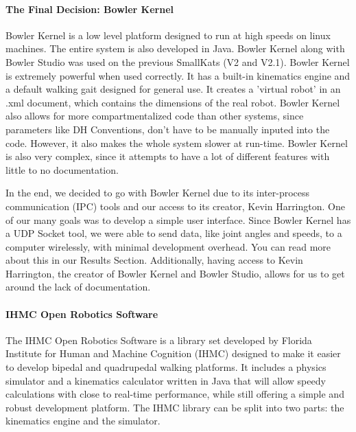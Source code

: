         \paragraph*{The Final Decision: Bowler Kernel}
        Bowler Kernel is a low level platform designed to run at high speeds on linux machines. The entire system is also developed in Java. Bowler Kernel along with Bowler Studio was used on the previous SmallKats (V2 and V2.1). Bowler Kernel is extremely powerful when used correctly. It has a built-in kinematics engine and a default walking gait designed for general use. It creates a 'virtual robot' in an .xml document, which contains the dimensions of the real robot. Bowler Kernel also allows for more compartmentalized code than other systems, since parameters like DH Conventions, don't have to be manually inputed into the code. However, it also makes the whole system slower at run-time. Bowler Kernel is also very complex, since it attempts to have a lot of different features with little to no documentation.

        In the end, we decided to go with Bowler Kernel due to its inter-process communication (IPC) tools and our access to its creator, Kevin Harrington. One of our many goals was to develop a simple user interface. Since Bowler Kernel has a UDP Socket tool, we were able to send data, like joint angles and speeds, to a computer wirelessly, with minimal development overhead. You can read more about this in our Results Section. Additionally, having access to Kevin Harrington, the creator of Bowler Kernel and Bowler Studio, allows for us to get around the lack of documentation.

        \paragraph*{IHMC Open Robotics Software}
        The IHMC Open Robotics Software is a library set developed by Florida Institute for Human and Machine Cognition (IHMC) designed to make it easier to develop bipedal and quadrupedal walking platforms. It includes a physics simulator and a kinematics calculator written in Java that will allow speedy calculations with close to real-time performance, while still offering a simple and robust development platform. The IHMC library can be split into two parts: the kinematics engine and the simulator.

